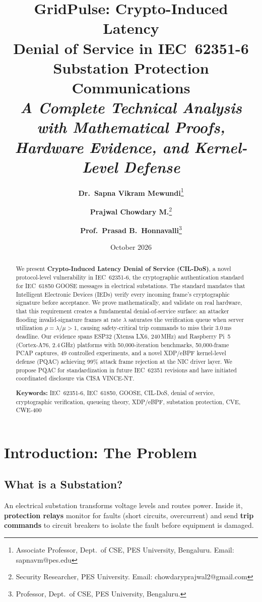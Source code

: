 \documentclass[11pt,a4paper,twocolumn]{article}
\title{\vspace{-1.5cm}\LARGE\bfseries GridPulse: Crypto-Induced Latency\\Denial of Service in IEC~62351-6\\Substation Protection Communications\\[0.5cm]
\large\textit{A Complete Technical Analysis with Mathematical Proofs,\\Hardware Evidence, and Kernel-Level Defense}}
\author{
\textbf{Dr.~Sapna Vikram Mewundi}\thanks{Associate Professor, Dept.\ of CSE, PES University, Bengaluru. Email: sapnavm@pes.edu}
\and
\textbf{Prajwal Chowdary M.}\thanks{Security Researcher, PES University. Email: chowdaryprajwal2@gmail.com}
\and
\textbf{Prof.~Prasad B.~Honnavalli}\thanks{Professor, Dept.\ of CSE, PES University, Bengaluru.}
}
\date{October 2026}
\begin{document}
\maketitle

\begin{abstract}
We present \textbf{Crypto-Induced Latency Denial of Service (CIL-DoS)}, a novel protocol-level vulnerability in IEC~62351-6, the cryptographic authentication standard for IEC~61850 GOOSE messages in electrical substations. The standard mandates that Intelligent Electronic Devices (IEDs) verify every incoming frame's cryptographic signature before acceptance. We prove mathematically, and validate on real hardware, that this requirement creates a fundamental denial-of-service surface: an attacker flooding invalid-signature frames at rate $\lambda$ saturates the verification queue when server utilization $\rho = \lambda / \mu > 1$, causing safety-critical trip commands to miss their 3.0\,ms deadline. Our evidence spans ESP32 (Xtensa LX6, 240\,MHz) and Raspberry Pi~5 (Cortex-A76, 2.4\,GHz) platforms with 50{,}000-iteration benchmarks, 50{,}000-frame PCAP captures, 49 controlled experiments, and a novel XDP/eBPF kernel-level defense (PQAC) achieving 99\% attack frame rejection at the NIC driver layer. We propose PQAC for standardization in future IEC~62351 revisions and have initiated coordinated disclosure via CISA VINCE-NT.

\medskip\noindent
\textbf{Keywords:} IEC~62351-6, IEC~61850, GOOSE, CIL-DoS, denial of service, cryptographic verification, queueing theory, XDP/eBPF, substation protection, CVE, CWE-400
\end{abstract}

\section{Introduction: The Problem}
\label{sec:intro}

\subsection{What is a Substation?}

An electrical substation transforms voltage levels and routes power. Inside it, \textbf{protection relays} monitor for faults (short circuits, overcurrent) and send \textbf{trip commands} to circuit breakers to isolate the fault before equipment is damaged.
\end{document}
